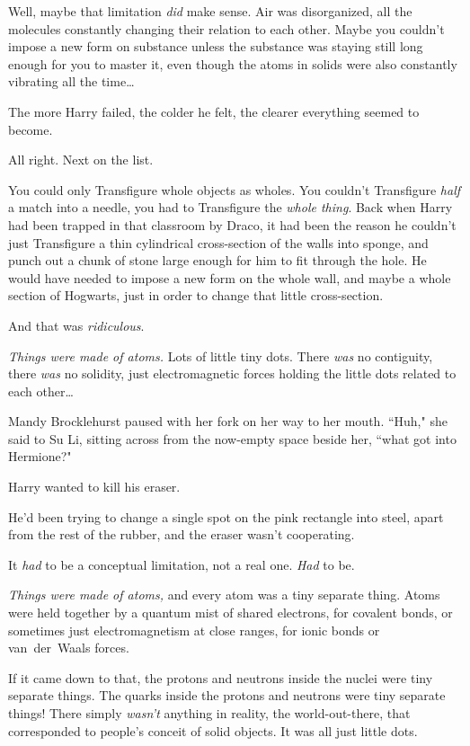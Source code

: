 Well, maybe that limitation \emph{did} make sense. Air was disorganized, all the molecules constantly changing their relation to each other. Maybe you couldn't impose a new form on substance unless the substance was staying still long enough for you to master it, even though the atoms in solids were also constantly vibrating all the time{\ldots}

The more Harry failed, the colder he felt, the clearer everything seemed to become.

All right. Next on the list.

You could only Transfigure whole objects as wholes. You couldn't Transfigure \emph{half} a match into a needle, you had to Transfigure the \emph{whole thing}. Back when Harry had been trapped in that classroom by Draco, it had been the reason he couldn't just Transfigure a thin cylindrical cross-section of the walls into sponge, and punch out a chunk of stone large enough for him to fit through the hole. He would have needed to impose a new form on the whole wall, and maybe a whole section of Hogwarts, just in order to change that little cross-section.

And that was \emph{ridiculous}.

\emph{Things were made of atoms.} Lots of little tiny dots. There \emph{was} no contiguity, there \emph{was} no solidity, just electromagnetic forces holding the little dots related to each other{\ldots}

\later

Mandy Brocklehurst paused with her fork on her way to her mouth. ``Huh," she said to Su Li, sitting across from the now-empty space beside her, ``what got into Hermione?"

\later

Harry wanted to kill his eraser.

He'd been trying to change a single spot on the pink rectangle into steel, apart from the rest of the rubber, and the eraser wasn't cooperating.

It \emph{had} to be a conceptual limitation, not a real one. \emph{Had} to be.

\emph{Things were made of atoms,} and every atom was a tiny separate thing. Atoms were held together by a quantum mist of shared electrons, for covalent bonds, or sometimes just electromagnetism at close ranges, for ionic bonds or van~der~Waals forces.

If it came down to that, the protons and neutrons inside the nuclei were tiny separate things. The quarks inside the protons and neutrons were tiny separate things! There simply \emph{wasn't} anything in reality, the world-out-there, that corresponded to people's conceit of solid objects. It was all just little dots.

